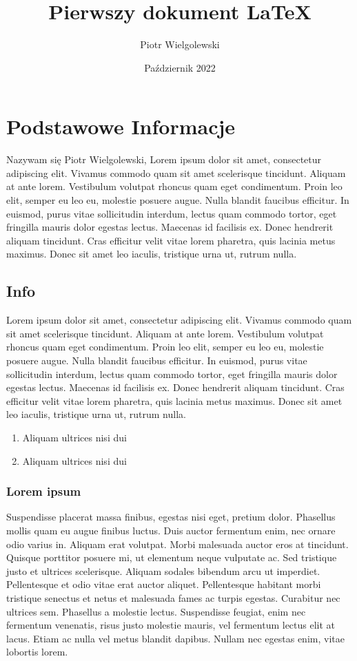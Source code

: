 \documentclass[12pt, letterpaper, titlepage]{article}
\title{Pierwszy dokument LaTeX}
\author{Piotr Wielgolewski}
\date{Październik 2022}
\begin{document}
\maketitle
\section{Podstawowe Informacje}
Nazywam się Piotr Wielgolewski, Lorem ipsum dolor sit amet, consectetur adipiscing elit. Vivamus commodo quam sit amet scelerisque tincidunt. Aliquam at ante lorem. Vestibulum volutpat rhoncus quam eget condimentum. Proin leo elit, semper eu leo eu, molestie posuere augue. Nulla blandit faucibus efficitur. In euismod, purus vitae sollicitudin interdum, lectus quam commodo tortor, eget fringilla mauris dolor egestas lectus. Maecenas id facilisis ex. Donec hendrerit aliquam tincidunt. Cras efficitur velit vitae lorem pharetra, quis lacinia metus maximus. Donec sit amet leo iaculis, tristique urna ut, rutrum nulla. 
\subsection{Info}
Lorem ipsum dolor sit amet, consectetur adipiscing elit. Vivamus commodo quam sit amet scelerisque tincidunt. Aliquam at ante lorem. Vestibulum volutpat rhoncus quam eget condimentum. Proin leo elit, semper eu leo eu, molestie posuere augue. Nulla blandit faucibus efficitur. In euismod, purus vitae sollicitudin interdum, lectus quam commodo tortor, eget fringilla mauris dolor egestas lectus. Maecenas id facilisis ex. Donec hendrerit aliquam tincidunt. Cras efficitur velit vitae lorem pharetra, quis lacinia metus maximus. Donec sit amet leo iaculis, tristique urna ut, rutrum nulla. 
\begin{enumerate}
\item Aliquam ultrices nisi dui
\item Aliquam ultrices nisi dui
\end{enumerate}
\subsubsection{Lorem ipsum}
Suspendisse placerat massa finibus, egestas nisi eget, pretium dolor. Phasellus mollis quam eu augue finibus luctus. Duis auctor fermentum enim, nec ornare odio varius in. Aliquam erat volutpat. Morbi malesuada auctor eros at tincidunt. Quisque porttitor posuere mi, ut elementum neque vulputate ac. Sed tristique justo et ultrices scelerisque. Aliquam sodales bibendum arcu ut imperdiet. Pellentesque et odio vitae erat auctor aliquet. Pellentesque habitant morbi tristique senectus et netus et malesuada fames ac turpis egestas. Curabitur nec ultrices sem. Phasellus a molestie lectus. Suspendisse feugiat, enim nec fermentum venenatis, risus justo molestie mauris, vel fermentum lectus elit at lacus. Etiam ac nulla vel metus blandit dapibus. Nullam nec egestas enim, vitae lobortis lorem. 
\newpage
\end{document}
